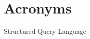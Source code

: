 \chapter*{Acronyms} %
\label{chap:acronyms}
\footnotesize
\begin{acronym}[ABCDE]
   {Structured Query Language}
\end{acronym}
\normalsize
